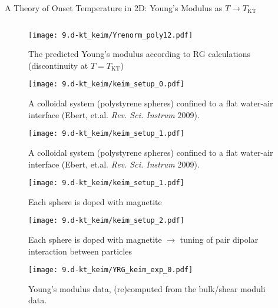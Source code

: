 

\begin{frame}{A Theory of Onset Temperature in 2D: Young's Modulus as $T \to T_\mathrm{KT}$}


\begin{columns}

\begin{column}[T]{0.425\textwidth}

\begin{figure}
    \begin{overprint}
    \centering\texttt{[image: 9.d-kt\_keim/Yrenorm\_poly12.pdf]}\caption{The predicted Young's modulus according to RG calculations (discontinuity at $T=T_\mathrm{KT}$)}
    
    \vspace{15pt}\centering\texttt{[image: 9.d-kt\_keim/keim\_setup\_0.pdf]}\caption{A colloidal system (polystyrene spheres) confined to a flat water-air interface (Ebert, et.al. \textit{Rev. Sci. Instrum} 2009).}
    
    \vspace{15pt}\centering\texttt{[image: 9.d-kt\_keim/keim\_setup\_1.pdf]}\caption{A colloidal system (polystyrene spheres) confined to a flat water-air interface (Ebert, et.al. \textit{Rev. Sci. Instrum} 2009).}
    
    \vspace{15pt}\centering\texttt{[image: 9.d-kt\_keim/keim\_setup\_1.pdf]}\caption{Each sphere is doped with magnetite}
    
    \vspace{15pt}\centering\texttt{[image: 9.d-kt\_keim/keim\_setup\_2.pdf]}\caption{Each sphere is doped with magnetite $\to$ tuning of pair dipolar interaction between particles}
    
    \centering\texttt{[image: 9.d-kt\_keim/YRG\_keim\_exp\_0.pdf]}\caption{Young's modulus data, (re)computed from the bulk/shear moduli data.}
    
    \raggedright{}
\end{overprint}
\end{figure}
\end{column}
\end{columns}
\end{frame}
